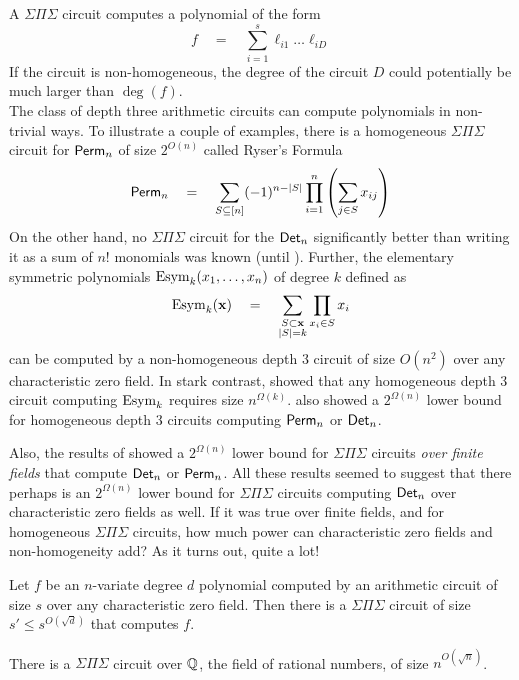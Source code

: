 \documentclass[12pt]{report}
\newcommand{\SPS}{\Sigma\Pi\Sigma}
\begin{document}
A $\Sigma\Pi\Sigma$ circuit computes a polynomial of the form
\[
f\quad=\quad \sum_{i=1}^s \ell_{i1}\dots \ell_{iD}
\]
If the circuit is non-homogeneous, the degree of the circuit $D$ could potentially be much larger than $\deg(f)$. \\

The class of depth three arithmetic circuits can compute polynomials in non-trivial ways. To illustrate a couple of examples, there is a homogeneous $\SPS$ circuit for $\mathsf{Perm}_n$ of size $2^{O(n)}$ called Ryser's Formula \cite{rys63}
\begin{equation}\label{eqn:ryser}
\mathsf{Perm}_n \quad = \quad \sum_{S \subseteq[n]} (-1)^{n - |S|} \prod_{i=1}^n \left(\sum_{j\in S} x_{ij}\right)
\end{equation}
On the other hand, no $\SPS$ circuit for the $\mathsf{Det}_n$ significantly better than writing it as a sum of $n!$ monomials was known (until \cite{gkks13b}). 
Further, the elementary symmetric polynomials $\mathrm{Esym}_k(x_1,\dots, x_n)$ of degree $k$ defined as
\[
\mathrm{Esym}_k(\mathbf{x}) \quad = \quad \sum_{\substack{S\subset \mathbf{x}\\|S| = k}} \prod_{x_i\in S}x_i
\]
can be computed by a non-homogeneous depth $3$ circuit of size $O(n^2)$ over any characteristic zero field. In stark contrast, \cite{nw1997} showed that any homogeneous depth $3$ circuit computing $\mathrm{Esym}_k$ requires size $n^{\Omega(k)}$. \cite{nw1997} also showed a $2^{\Omega(n)}$ lower bound for homogeneous depth $3$ circuits computing $\mathsf{Perm}_n$ or $\mathsf{Det}_n$. 

Also, the results of \cite{gr00,grigoriev98} showed a $2^{\Omega(n)}$ lower bound for $\SPS$ circuits \emph{over finite fields} that compute $\mathsf{Det}_n$ or $\mathsf{Perm}_n$. All these results seemed to suggest that there perhaps is an $2^{\Omega(n)}$ 
lower bound for $\SPS$ circuits computing $\mathsf{Det}_n$ over characteristic zero fields as well. If it was true over finite fields, and for homogeneous $\SPS$ circuits, how much power can characteristic zero fields and non-homogeneity add? As it turns out, quite a lot!

\begin{theorem} \label{thm:chasm-at-3}
Let $f$ be an $n$-variate degree $d$ polynomial computed by an arithmetic circuit of size $s$ over any characteristic zero field. Then there is a $\SPS$ circuit of size $s' \leq s^{O(\sqrt{d})}$ that computes $f$. 
\end{theorem}
\begin{corollary}\label{cor:det-sps}
There is a $\SPS$ circuit over $\mathbb{Q}$, the field of rational numbers, of size $n^{O(\sqrt{n})}$. 
\end{corollary}
\end{document}
